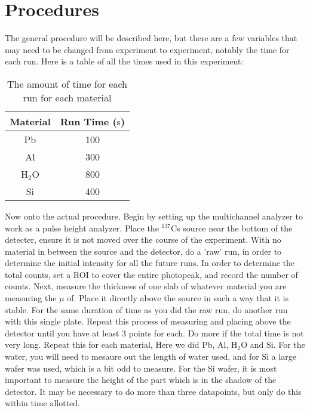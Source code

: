\documentclass[letterpaper,12pt]{article}
\begin{document}
\section{Procedures}
The general procedure will be described here, but there are a few variables that may need to be changed from experiment to experiment, notably the time for each run. Here is a table of all the times used in this experiment:
\begin{table}[H]
  \centering
  \begin{tabular}{cc}
    \hline
    Material & Run Time ($\si{\s}$) \\ \hline
    Pb       & 100                  \\                     
    Al       & 300                  \\
    H$_2$O   & 800                  \\
    Si       & 400                  \\
    \hline
  \end{tabular}
  \caption{The amount of time for each run for each material}
  \label{tab:times}
\end{table}

Now onto the actual procedure. Begin by setting up the multichannel analyzer to work as a pulse height analyzer. Place the $^{137}$Cs source near the bottom of the detecter, ensure it is not moved over the course of the experiment. With no material in between the source and the detector, do a 'raw' run, in order to determine the initial intensity for all the future runs. In order to determine the total counts, set a ROI to cover the entire photopeak, and record the number of counts. Next, measure the thickness of one slab of whatever material you are measuring the $\mu$ of. Place it directly above the source in such a way that it is stable. For the same duration of time as you did the raw run, do another run with this single plate. Repeat this process of measuring and placing above the detector until you have at least 3 points for each. Do more if the total time is not very long. Repeat this for each material, Here we did Pb, Al, H$_2$O and Si. For the water, you will need to mesaure out the length of water used, and for Si a large wafer was used, which is a bit odd to measure. For the Si wafer, it is most important to measure the height of the part which is in the shadow of the detector. It may be necessary to do more than three datapoints, but only do this within time allotted.
\newpage
\end{document}
